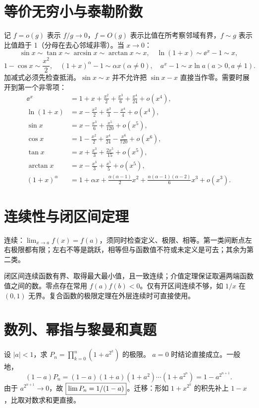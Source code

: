 \section{等价无穷小与泰勒阶数}
记 $f=o(g)$ 表示 $f/g\to0$，$f=O(g)$ 表示比值在所考察邻域有界，$f\sim g$ 表示比值趋于 1（分母在去心邻域非零）。当 $x\to0$：
\[
\sin x\sim\tan x\sim\arcsin x\sim\arctan x\sim x,\quad
\ln(1+x)\sim\ee^x-1\sim x,
\]
\[
1-\cos x\sim\frac{x^2}2,\quad (1+x)^\alpha-1\sim\alpha x (\alpha\ne0),\quad
 a^x-1\sim x\ln a (a>0,a\ne1).
\]
加减式必须先检查抵消。$\sin x\sim x$ 并不允许把 $\sin x-x$ 直接当作零。需要时展开到第一个非零项：
\begin{align*}
\ee^x&=1+x+\frac{x^2}2+\frac{x^3}6+\frac{x^4}{24}+o(x^4),\\
\ln(1+x)&=x-\frac{x^2}2+\frac{x^3}3-\frac{x^4}4+o(x^4),\\
\sin x&=x-\frac{x^3}6+\frac{x^5}{120}+o(x^5),\\
\cos x&=1-\frac{x^2}2+\frac{x^4}{24}-\frac{x^6}{720}+o(x^6),\\
\tan x&=x+\frac{x^3}3+\frac{2x^5}{15}+o(x^5),\\
\arctan x&=x-\frac{x^3}3+\frac{x^5}5+o(x^5),\\
(1+x)^\alpha&=1+\alpha x+\frac{\alpha(\alpha-1)}2x^2+\frac{\alpha(\alpha-1)(\alpha-2)}6x^3+o(x^3).
\end{align*}

\section{连续性与闭区间定理}
连续：$\lim_{x\to a}f(x)=f(a)$，须同时检查定义、极限、相等。第一类间断点左右极限都有限；左右不等是跳跃，相等但与函数值不符或未定义是可去；其余为第二类。

闭区间连续函数有界、取得最大最小值，且一致连续；介值定理保证取遍两端函数值之间的数。零点存在常用 $f(a)f(b)<0$。仅有开区间连续不够，如 $1/x$ 在 $(0,1)$ 无界。复合函数的极限定理在外层连续时可直接使用。

\section{数列、幂指与黎曼和真题}
设 $|a|<1$，求 $P_n=\prod_{k=0}^n(1+a^{2^k})$ 的极限。
\sol $a=0$ 时结论直接成立。一般地，
\[(1-a)P_n=(1-a)(1+a)(1+a^2)\cdots(1+a^{2^n})=1-a^{2^{n+1}}.\]
由于 $a^{2^{n+1}}\to0$，故 $\boxed{\lim P_n=1/(1-a)}$。迁移：形如 $1+x^{2^k}$ 的积先补上 $1-x$，比取对数求和更直接。

